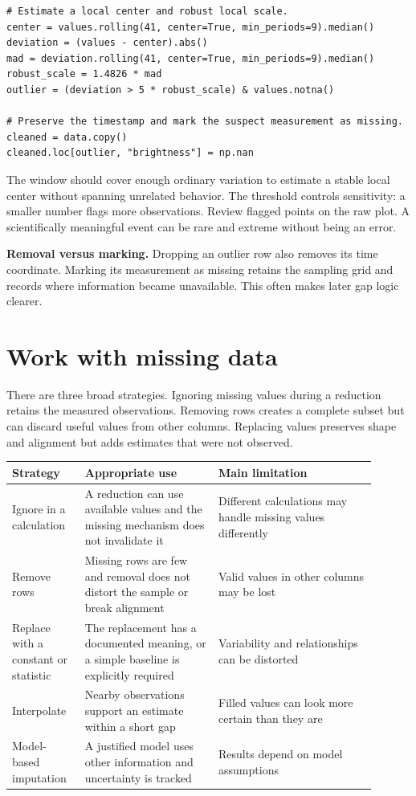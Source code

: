 \documentclass[11pt,letterpaper]{article}
\begin{document}
\begin{lstlisting}
# Estimate a local center and robust local scale.
center = values.rolling(41, center=True, min_periods=9).median()
deviation = (values - center).abs()
mad = deviation.rolling(41, center=True, min_periods=9).median()
robust_scale = 1.4826 * mad
outlier = (deviation > 5 * robust_scale) & values.notna()

# Preserve the timestamp and mark the suspect measurement as missing.
cleaned = data.copy()
cleaned.loc[outlier, "brightness"] = np.nan
\end{lstlisting}

The window should cover enough ordinary variation to estimate a stable local
center without spanning unrelated behavior. The threshold controls sensitivity:
a smaller number flags more observations. Review flagged points on the raw plot.
A scientifically meaningful event can be rare and extreme without being an
error.

\textbf{Removal versus marking.} Dropping an outlier row also removes its time
coordinate. Marking its measurement as missing retains the sampling grid and
records where information became unavailable. This often makes later gap logic
clearer.

\section{Work with missing data}

There are three broad strategies. Ignoring missing values during a reduction
retains the measured observations. Removing rows creates a complete subset but
can discard useful values from other columns. Replacing values preserves shape
and alignment but adds estimates that were not observed.

\begin{longtable}{@{}p{0.18\linewidth}p{0.33\linewidth}p{0.39\linewidth}@{}}
\toprule
Strategy & Appropriate use & Main limitation \\
\midrule
\endhead
Ignore in a calculation & A reduction can use available values and the missing mechanism does not invalidate it & Different calculations may handle missing values differently \\
Remove rows & Missing rows are few and removal does not distort the sample or break alignment & Valid values in other columns may be lost \\
Replace with a constant or statistic & The replacement has a documented meaning, or a simple baseline is explicitly required & Variability and relationships can be distorted \\
Interpolate & Nearby observations support an estimate within a short gap & Filled values can look more certain than they are \\
Model-based imputation & A justified model uses other information and uncertainty is tracked & Results depend on model assumptions \\
\bottomrule
\end{longtable}
\end{document}
